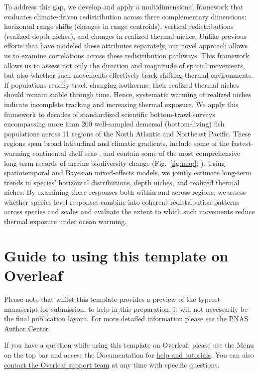 \documentclass[9pt,twocolumn,twoside]{pnas-new}
\begin{document}
To address this gap, we develop and apply a multidimensional framework that evaluates climate-driven redistribution across three complementary dimensions: horizontal range shifts (changes in range centroids), vertical redistributions (realized depth niches), and changes in realized thermal niches. Unlike previous efforts that have modeled these attributes separately, our novel approach allows us to examine correlations across these redistribution pathways. This framework allows us to assess not only the direction and magnitude of spatial movements, but also whether such movements effectively track shifting thermal environments. If populations readily track changing isotherms, their realized thermal niches should remain stable through time. Hence, systematic warming of realized niches indicate incomplete tracking and increasing thermal exposure. We apply this framework to decades of standardized scientific bottom-trawl surveys encompassing more than 200 well-sampled demersal (bottom-living) fish populations across 11 regions of the North Atlantic and Northeast Pacific. These regions span broad latitudinal and climatic gradients, include some of the fastest-warming continental shelf seas \citep{pershing_slow_2015, song_arctic_2023}, and contain some of the most comprehensive long-term records of marine biodiversity change (Fig.~\ref{fig:map}; \citep{maureaud_are_2021, maureaud_fishglob_data_2024}). Using spatiotemporal and Bayesian mixed-effects models, we jointly estimate long-term trends in species’ horizontal distributions, depth niches, and realized thermal niches. By examining these responses both within and across regions, we assess whether species-level responses combine into coherent redistribution patterns across species and scales and evaluate the extent to which such movements reduce thermal exposure under ocean warming.



\section*{Guide to using this template on Overleaf}

Please note that whilst this template provides a preview of the typeset manuscript for submission, to help in this preparation, it will not necessarily be the final publication layout. For more detailed information please see the  \href{https://www.pnas.org/author-center/submitting-your-manuscript}{PNAS Author Center}.


If you have a question while using this template on Overleaf, please use the Menu on the top bar and access the Documentation for \href{https://www.overleaf.com/help}{help and tutorials}. You can also \href{https://www.overleaf.com/contact}{contact the Overleaf support team} at any time with specific questions.
\end{document}
